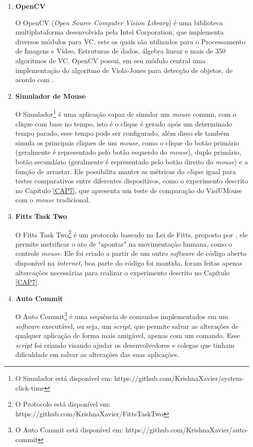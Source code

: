 \begin{enumerate}
\item \textbf{OpenCV}

O OpenCV (\textit{Open Source Computer Vision Library}) é uma biblioteca multiplataforma desenvolvida pela Intel Corporation, que implementa diversos módulos para VC, este os quais são utilizados para o Processamento de Imagens e Vídeo, Estruturas de dados, álgebra linear e mais de 350 algoritmos de VC. OpenCV possui, em seu módulo central uma implementação do algoritmo de Viola-Jones para detecção de objetos, de acordo com \cite{bradski2008learning}.

\item \textbf{Simulador de Mouse}

O Simulador\footnote{O Simulador está disponível em: https://github.com/KrishnaXavier/system-click-time} é uma aplicação capaz de simular um \textit{mouse} comum, com o clique com base no tempo, isto é o clique é gerado após um determinado tempo parado, esse tempo pode ser configurado, além disso ele também simula os principais cliques de um \textit{mouse}, como o clique do botão primário (geralmente é representado pelo botão esquerdo do \textit{mouse}), duplo primário, botão secundário (geralmente é representado pelo botão direito do \textit{mouse}) e a função de arrastar. Ele possibilita manter as métricas do \textit{clique} igual para testes comparativos entre diferentes dispositivos, como o experimento descrito no Capítulo \ref{CAP7}, que apresenta um teste de comparação do VisiUMouse com o \textit{mouse} tradicional.

\item \textbf{Fitts Task Two}

O Fitts Task Two\footnote{O Protocolo está disponível em: https://github.com/KrishnaXavier/FittsTaskTwo} é um protocolo baseado na Lei de Fitts, proposto por , ele permite metrificar o ato de "apontar" na movimentação humana, como o controle \textit{mouse}. Ele foi criado a partir de um outro \textit{software} de código aberto disponível na \textit{internet}, boa parte do código foi mantida, foram feitas apenas altercações necessárias para realizar o experimento descrito no Capítulo \ref{CAP7}.

\item \textbf{Auto Commit}

O Auto Commit\footnote{O Auto Commit está disponível em: https://github.com/KrishnaXavier/auto-commit} é uma sequência de comandos implementados em um \textit{software} executável, ou seja, um \textit{script}, que permite salvar as alterações de qualquer aplicação de forma mais amigável, apenas com um comando. Esse \textit{script} foi criando visando ajudar os desenvolvedores e colegas que tinham dificuldade em salvar as alterações das suas aplicações.

\end{enumerate}

